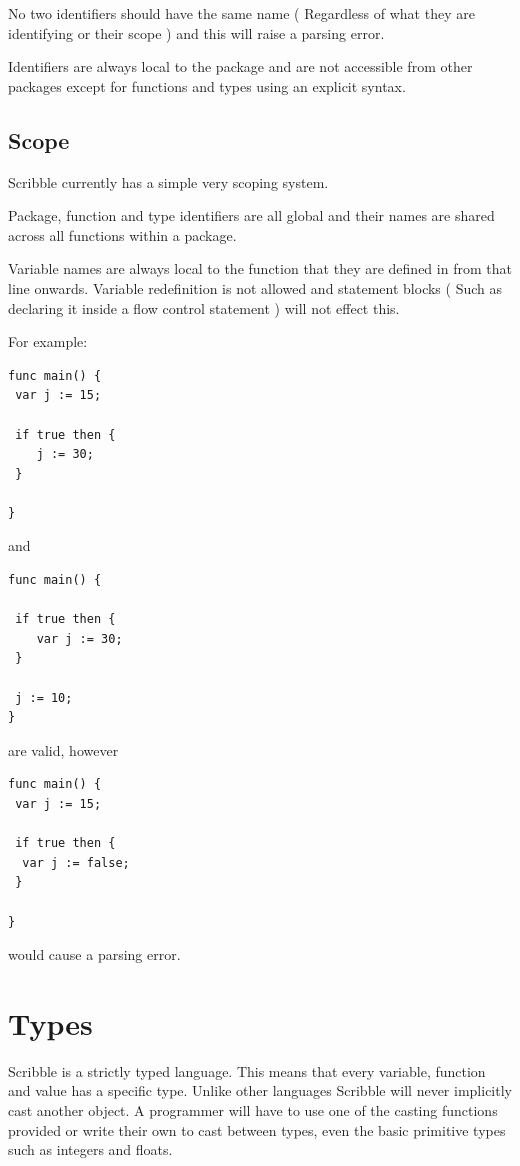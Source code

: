 \documentclass[]{final_report}
\begin{document}
No two identifiers should have the same name ( Regardless of what they are identifying or their scope ) and this will raise a parsing error.

Identifiers are always local to the package and are not accessible from other packages except for functions and types using an explicit syntax.

\subsection{Scope}

Scribble currently has a simple very scoping system.

Package, function and type identifiers are all global and their names are shared across all functions within a package.

Variable names are always local to the function that they are defined in from that line onwards. Variable redefinition is not allowed and statement blocks ( Such as declaring it inside a flow control statement ) will not effect this.

For example:
\begin{verbatim}
func main() {
 var j := 15;
 
 if true then {
 	j := 30;
 }

}
\end{verbatim}
and
\begin{verbatim}
func main() {
 
 if true then {
 	var j := 30;
 }
 
 j := 10;
}
\end{verbatim}
are valid, however
\begin{verbatim}
func main() {
 var j := 15;
 
 if true then { 
  var j := false; 
 }

}
\end{verbatim}
would cause a parsing error.

\section{Types}

Scribble is a strictly typed language. This means that every variable, function and value has a specific type. Unlike other languages Scribble will never implicitly cast another object. A programmer will have to use one of the casting functions provided or write their own to cast between types, even the basic primitive types such as integers and floats.
\end{document}
